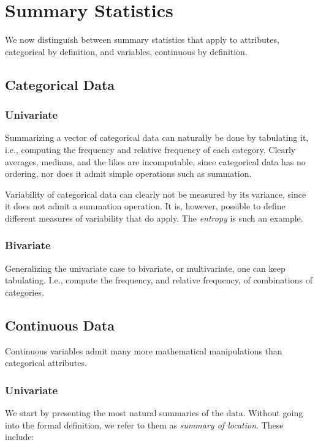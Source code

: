 \documentclass[12pt,a4paper]{report}
\begin{document}
\section{Summary Statistics}
We now distinguish between summary statistics that apply to attributes, categorical by definition, and variables, continuous by definition. 


\subsection{Categorical Data}

\subsubsection{Univariate}
Summarizing a vector of categorical data can naturally be done by tabulating it, i.e., computing the frequency and relative frequency of each category.
Clearly averages, medians, and the likes are incomputable, since categorical data has no ordering, nor does it admit simple operations such as summation.

\begin{extra}
Variability of categorical data can clearly not be measured by its variance, since it does not admit a summation operation.
It is, however, possible to define different measures of variability that do apply.
The \emph{entropy} is such an example.
\end{extra}


\subsubsection{Bivariate}
Generalizing the univariate case to bivariate, or multivariate, one can keep tabulating. I.e., compute the frequency, and relative frequency, of combinations of categories.



\subsection{Continuous Data}
Continuous variables admit many more mathematical manipulations than categorical attributes. 


\subsubsection{Univariate}

We start by presenting the most natural summaries of the data. Without going into the formal definition, we refer to them as \emph{summary of location}.
These include:
\end{document}
